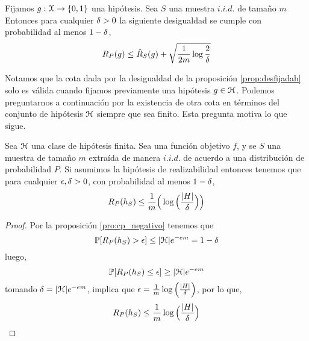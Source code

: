     \begin{proposicion}\label{prop:desfijadah}
     Fijamos $g:\mathcal{X} \to \{0,1\}$ una hipótesis. Sea $S$ una muestra $i.i.d.$ de tamaño $m$ Entonces para cualquier $\delta>0$ la siguiente desigualdad se cumple con probabilidad al menos $1-\delta$,
     \begin{equation}
         R_P(g) \leq \hat{R}_S(g) + \sqrt{\frac{1}{2m}\log{\frac{2}{\delta}}}
     \end{equation}
    \end{proposicion}
    
    
    Notamos que la cota dada por la desigualdad de la proposición \ref{prop:desfijadah} solo es válida cuando fijamos previamente una hipótesis $g \in \mathcal{H}$. Podemos preguntarnos a continuación por la existencia de otra cota en términos del conjunto de hipótesis $\mathcal{H}$ siempre que sea finito. Esta pregunta motiva lo que sigue.
    
    
    \begin{proposicion}
         Sea $\mathcal{H}$ una clase de hipótesis finita. Sea una función objetivo $f$, y se $S$ una muestra de tamaño $m$ extraída de manera $i.i.d.$ de acuerdo a una distribución de probabilidad $P$. Si asumimos la hipótesis de realizabilidad entonces tenemos que para cualquier $\epsilon,\delta > 0$, con probabilidad al menos $1-\delta$,
         \begin{equation}
            R_P(h_S) \leq \frac{1}{m}\Big( \log\Big(\frac{|H|}{\delta}\Big) \Big) 
         \end{equation}
    \end{proposicion}
    
        \begin{proof}
        Por la proposición \ref{pro:cp_negativo} tenemos que
            \begin{equation}
                \mathbb{P}[R_{P}(h_S) > \epsilon] \leq |\mathcal{H}| e^{-em} = 1 - \delta
            \end{equation}
        \noindent luego, 
            \begin{equation}
                \mathbb{P}[R_{P}(h_S) \leq \epsilon] \geq  |\mathcal{H}| e^{-em} 
            \end{equation}
        \noindent tomando $\delta = |\mathcal{H}| e^{-em}$, implica que $\epsilon = \frac{1}{m}\log\Big( \frac{|H|}{\delta} \Big)$, por lo que,
            \begin{equation}
                R_P(h_S) \leq \frac{1}{m}\log\Big( \frac{|H|}{\delta} \Big)
            \end{equation}
        \end{proof}


